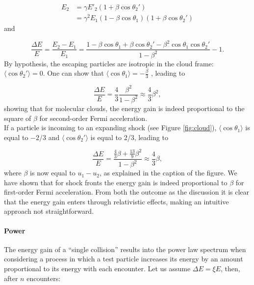 \begin{equation}
\begin{split}
E_2 &= \gamma E'_2 \left(1+\beta \cos \theta_2'\right)\\
&=\gamma^2 E_1 \left(1-\beta \cos \theta_1\right) \left( 1 + \beta \cos \theta_2'\right)
\end{split}
\end{equation}
and

\begin{equation}
\frac{\Delta E}{E} = \frac{E_2 -E_1}{E_1} = \frac{1 - 
\beta \cos \theta_1 + \beta \cos \theta_2' - \beta^2 \cos \theta_1 \cos \theta_2'}{1-\beta^2} -1.
\end{equation}
By hypothesis, the escaping particles are isotropic in the cloud frame: $\langle \cos \theta_2' \rangle = 0$. One can show that $\langle \cos \theta_1 \rangle = -\frac{\beta}{3}$ \cite{Gaisser:2016uoy}, leading to

\begin{equation}
\frac{\Delta E}{E} = \frac{4}{3} \frac{\beta^2}{1-\beta^2} \approx \frac{4}{3} \beta^2,
\end{equation}
showing that for molecular clouds, the energy gain is indeed proportional to the square of $\beta$ for second-order Fermi acceleration.\\
\newline
If a particle is incoming to an expanding shock (see Figure \ref{fig:cloud}), $\langle \cos \theta_1\rangle$ is equal to $-2/3$ and $\langle \cos \theta_2'\rangle$ is equal to 2/3, leading to

\begin{equation}
\frac{\Delta E}{E} = \frac{\frac{4}{3}\beta + \frac{13}{9}\beta^2}{1-\beta^2} \approx \frac{4}{3} \beta,
\end{equation}
where $\beta$ is now equal to $u_1 -u_2$, as explained in the caption of the figure. We have shown that for shock fronts the energy gain is indeed proportional to $\beta$ for first-order Fermi acceleration. From both the outcome as the discussion it is clear that the energy gain enters through relativistic effects, making an intuitive approach not straightforward.

\paragraph{Power}
\label{para:power}
The energy gain of a ``single collision'' results into the power law spectrum when considering a process in which a test particle increases its energy by an amount proportional to its energy with each encounter. Let us assume $\Delta E = \xi E$, then, after $n$ encounters:

